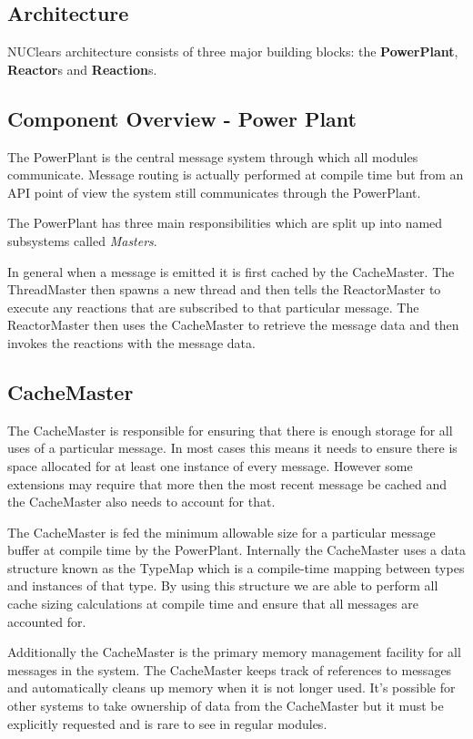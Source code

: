 \documentclass[english,12pt]{scrartcl}
\begin{document}
		\subsection{Architecture}
			NUClears architecture consists of three major building blocks: the \textbf{PowerPlant}, \textbf{Reactor}s and \textbf{Reaction}s. 
		
		\subsection{Component Overview - Power Plant}
			The PowerPlant is the central message system through which all modules communicate. 
			Message routing is actually performed at compile time but from an API point of view the system still communicates through the PowerPlant.
			
			The PowerPlant has three main responsibilities which are split up into named subsystems called \emph{Masters}.
			
			In general when a message is emitted it is first cached by the CacheMaster. 
			The ThreadMaster then spawns a new thread and then tells the ReactorMaster to execute any reactions that are subscribed to that particular message. 
			The ReactorMaster then uses the CacheMaster to retrieve the message data and then invokes the reactions with the message data.
	
			\subsection{CacheMaster}
				The CacheMaster is responsible for ensuring that there is enough storage for all uses of a particular message.
				In most cases this means it needs to ensure there is space allocated for at least one instance of every message.
				However some extensions may require that more then the most recent message be cached and the CacheMaster also needs to account for that.
				
				The CacheMaster is fed the minimum allowable size for a particular message buffer at compile time by the PowerPlant.
				Internally the CacheMaster uses a data structure known as the TypeMap which is a compile-time mapping between types and instances of that type.
				By using this structure we are able to perform all cache sizing calculations at compile time and ensure that all messages are accounted for.
				
				Additionally the CacheMaster is the primary memory management facility for all messages in the system.
				The CacheMaster keeps track of references to messages and automatically cleans up memory when it is not longer used.
				It's possible for other systems to take ownership of data from the CacheMaster but it must be explicitly requested and is rare to see in regular modules.
				
\end{document}
